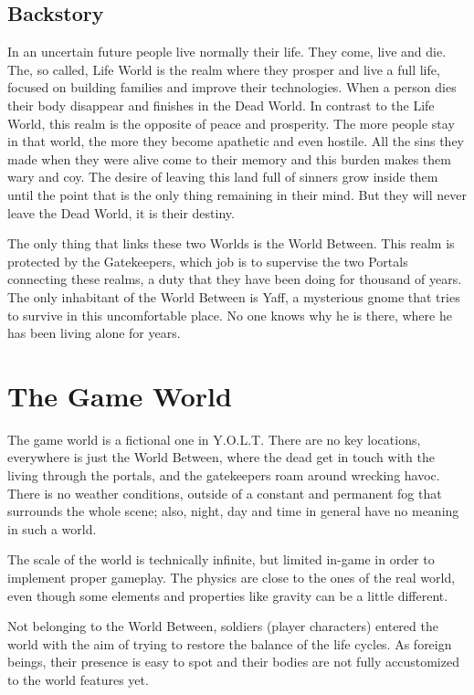 \documentclass[12pt]{article}
\begin{document}
\subsection{Backstory}

In an uncertain future people live normally their life. They come, live and die. The, so called, Life World is the realm where they prosper and live a full life, focused on building families and improve their technologies. When a person dies their body disappear and finishes in the Dead World. In contrast to the Life World, this realm is the opposite of peace and prosperity. The more people stay in that world, the more they become apathetic and even hostile. All the sins they made when they were alive come to their memory and this burden makes them wary and coy. The desire of leaving this land full of sinners grow inside them until the point that is the only thing remaining in their mind. But they will never leave the Dead World, it is their destiny.

The only thing that links these two Worlds is the World Between. This realm is protected by the Gatekeepers, which job is to supervise the two Portals connecting these realms, a duty that they have been doing for thousand of years. 
The only inhabitant of the World Between is Yaff, a mysterious gnome that tries to survive in this uncomfortable place. No one knows why he is there, where he has been living alone for years.

\newpage

\section{The Game World}

The game world is a fictional one in Y.O.L.T. There are no key locations, everywhere is just the World Between, where the dead get in touch with the living through the portals, and the gatekeepers roam around wrecking havoc. There is no weather conditions, outside of a constant and permanent fog that surrounds the whole scene; also, night, day and time in general have no meaning in such a world.

The scale of the world is technically infinite, but limited in-game in order to implement proper gameplay. The physics are close to the ones of the real world, even though some elements and properties like gravity can be a little different.

Not belonging to the World Between, soldiers (player characters) entered the world with the aim of trying to restore the balance of the life cycles. As foreign beings, their presence is easy to spot and their bodies are not fully accustomized to the world features yet.
\end{document}
